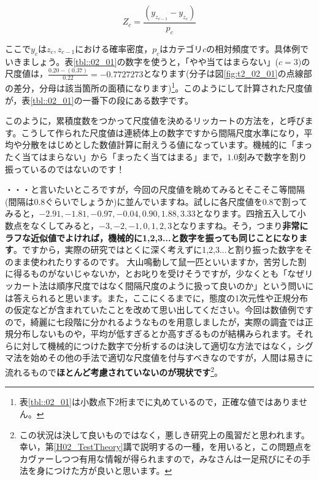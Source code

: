 \documentclass{ltjsbook}
\begin{document}
\[ Z_c = \frac{(y_{z_{c-1}} - y_{z_c})}{p_c} \]

ここで$y_c$は$z_c,z_{c-1}$における確率密度，$p_c$はカテゴリ$c$の相対頻度です。具体例でいきましょう。表\ref{tbl::02_01}の数字を使うと，「やや当てはまらない」($c=3$)の尺度値は，$\frac{0.20-(0.37)}{0.22}=-0.7727273$となります(分子は図\ref{fig:t2_02_01}の点線部の差分，分母は該当箇所の面積になります)\footnote{表\ref{tbl::02_01}は小数点下2桁までに丸めているので，正確な値ではありません。}。このようにして計算された尺度値が，表\ref{tbl::02_01}の一番下の段にある数字です。

このように，累積度数をつかって尺度値を決めるリッカートの方法を，と呼びます。こうして作られた尺度値は連続体上の数字ですから間隔尺度水準になり，平均や分散をはじめとした数値計算に耐えうる値になっています。機械的に「まったく当てはまらない」から「まったく当てはまる」まで，$1.0$刻みで数字を割り振っているのではないのです！


・・・と言いたいところですが，今回の尺度値を眺めてみるとそこそこ等間隔(間隔は$0.8$ぐらいでしょうか)に並んでいますね。試しに各尺度値を0.8で割ってみると，$-2.91,-1.81,-0.97, -0.04,0.90, 1.88, 3.33$となります。四捨五入して小数点をなくしてみると，$-3,-2,-1,0,1,2,3$となりますね。そう，つまり\textbf{非常にラフな近似値でよければ，機械的に1,2,3...と数字を振っても同じことになります}。ですから，実際の研究ではとくに深く考えずに1,2,3...と割り振った数字をそのまま使われたりするのです。
大山鳴動して鼠一匹といいますか，苦労した割に得るものがないじゃないか，とお叱りを受けそうですが，少なくとも「なぜリッカート法は順序尺度ではなく間隔尺度のように扱って良いのか」という問いには答えられると思います。また，ここにくるまでに，態度の1次元性や正規分布の仮定などが含まれていたことを改めて思い出してください。今回は数値例ですので，綺麗に七段階に分かれるようなものを用意しましたが，実際の調査では正規分布しないものや，平均が低すぎるとか高すぎるものが結構みられます。それらに対して機械的につけた数字で分析するのは決して適切な方法ではなく，シグマ法を始めその他の手法で適切な尺度値を付与すべきなのですが，人間は易きに流れるもので\textbf{ほとんど考慮されていないのが現状です}\footnote{この状況は決して良いものではなく，悪しき研究上の風習だと思われます。幸い，第\ref{H02_TestTheory}講で説明するの一種，を用いると，この問題点をカヴァーしつつ有用な情報が得られますので，みなさんは一足飛びにその手法を身につけた方が良いと思います。}。
\end{document}

